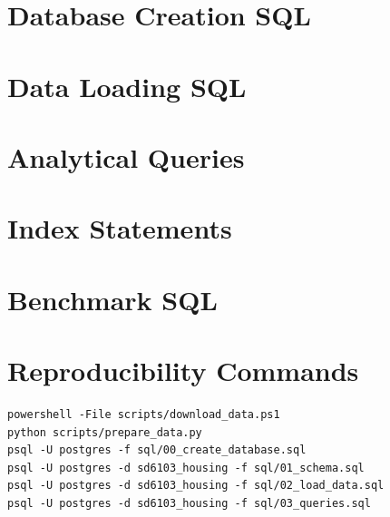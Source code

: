 \documentclass[11pt,a4paper]{article}
\begin{document}



\appendix
\section{Database Creation SQL}\label{app:ddl}

\section{Data Loading SQL}

\section{Analytical Queries}\label{app:queries}

\section{Index Statements}\label{app:index}

\section{Benchmark SQL}

\section{Reproducibility Commands}
\begin{lstlisting}[language={}]
powershell -File scripts/download_data.ps1
python scripts/prepare_data.py
psql -U postgres -f sql/00_create_database.sql
psql -U postgres -d sd6103_housing -f sql/01_schema.sql
psql -U postgres -d sd6103_housing -f sql/02_load_data.sql
psql -U postgres -d sd6103_housing -f sql/03_queries.sql
\end{lstlisting}
\end{document}
